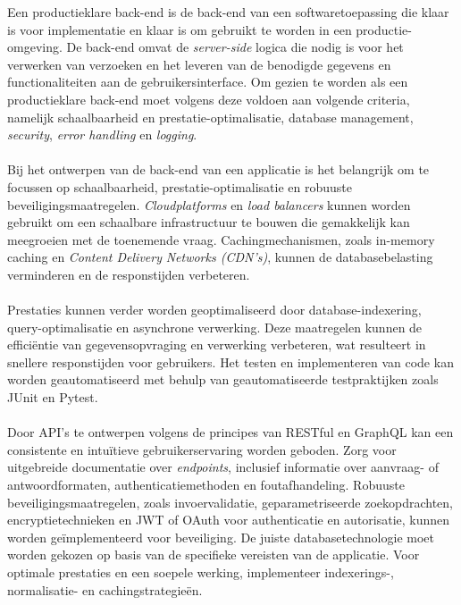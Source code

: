 Een productieklare back-end is de back-end van een softwaretoepassing die klaar is voor implementatie en klaar is om gebruikt te worden in een productie-omgeving. De back-end omvat de \textit{server-side} logica die nodig is voor het verwerken van verzoeken en het leveren van de benodigde gegevens en functionaliteiten aan de gebruikersinterface. Om gezien te worden als een productieklare back-end moet volgens \textcite{Senthilkumar2023} deze voldoen aan volgende criteria, namelijk schaalbaarheid en prestatie-optimalisatie, database management, \textit{security}, \textit{error handling} en \textit{logging}. 
 \\  \\
Bij het ontwerpen van de back-end van een applicatie is het belangrijk om te focussen op schaalbaarheid, prestatie-optimalisatie en robuuste beveiligingsmaatregelen. \textit{Cloudplatforms} en \textit{load balancers} kunnen worden gebruikt om een schaalbare infrastructuur te bouwen die gemakkelijk kan meegroeien met de toenemende vraag. Cachingmechanismen, zoals in-memory caching en \textit{Content Delivery} \textit{Networks (CDN's)}, kunnen de databasebelasting verminderen en de responstijden verbeteren.
 \\  \\
Prestaties kunnen verder worden geoptimaliseerd door database-indexering, query-optimalisatie en asynchrone verwerking. Deze maatregelen kunnen de efficiëntie van gegevensopvraging en verwerking verbeteren, wat resulteert in snellere responstijden voor gebruikers. Het testen en implementeren van code kan worden geautomatiseerd met behulp van geautomatiseerde testpraktijken zoals JUnit en Pytest.
 \\  \\
Door API's te ontwerpen volgens de principes van RESTful en GraphQL kan een \\consistente en intuïtieve gebruikerservaring worden geboden. Zorg voor uitgebreide documentatie over \textit{endpoints}, inclusief informatie over aanvraag- of antwoordformaten, authenticatiemethoden en foutafhandeling. Robuuste \\beveiligingsmaatregelen, zoals invoervalidatie, geparametriseerde zoekopdrachten, encryptietechnieken en JWT of OAuth voor authenticatie en autorisatie, kunnen worden geïmplementeerd voor beveiliging. De juiste databasetechnologie moet worden gekozen op basis van de specifieke vereisten van de applicatie. Voor optimale prestaties en een soepele werking, implementeer indexerings-, normalisatie- en cachingstrategieën.
 \\  \\
